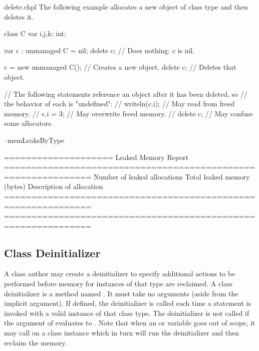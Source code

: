 \begin{chapelexample}{delete.chpl}
The following example allocates a new object  of class type 
and then deletes it.
\begin{chapelpre}
class C {
  var i,j,k: int;
}
\end{chapelpre}
\begin{chapel}
var c : unmanaged C = nil;
delete c;              // Does nothing: c is nil.

c = new unmanaged C(); // Creates a new object.
delete c;              // Deletes that object.

// The following statements reference an object after it has been deleted, so
// the behavior of each is "undefined":
// writeln(c.i); // May read from freed memory.
// c.i = 3;      // May overwrite freed memory.
// delete c;     // May confuse some allocators.
\end{chapel}
\begin{chapelpost}
\end{chapelpost}
\begin{chapelexecopts}
--memLeaksByType
\end{chapelexecopts}
\begin{chapeloutput}

====================
Leaked Memory Report
==============================================================
Number of leaked allocations
           Total leaked memory (bytes)
                      Description of allocation
==============================================================
==============================================================
\end{chapeloutput}
\end{chapelexample}

\subsection{Class Deinitializer}
\label{Class_Deinitializer}

A class author may create a deinitializer to specify additional actions
to be performed before memory for instances of that type are reclaimed.
A class deinitializer is a method named .  It must take no
arguments (aside from the implicit  argument).  If defined,
the deinitializer is called each time a  statement is
invoked with a valid instance of that class type. The deinitializer is
not called if the argument of  evaluates to .
Note that when an  or  variable goes out of
scope, it may call  on a class instance which in turn will
run the deinitializer and then reclaim the memory.

